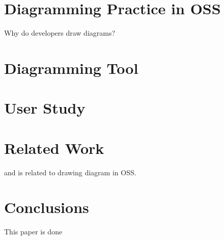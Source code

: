 \documentclass{sig-alternate}
\begin{document}
\section{Diagramming Practice in OSS}
Why do developers draw diagrams?


\section{Diagramming Tool}

\section{User Study}

\section{Related Work}
\cite{Yatani2009} and \cite{Eunyoung2010} is related to drawing diagram in OSS.



\section{Conclusions}
This paper is done



\nocite{*}

\end{document}
